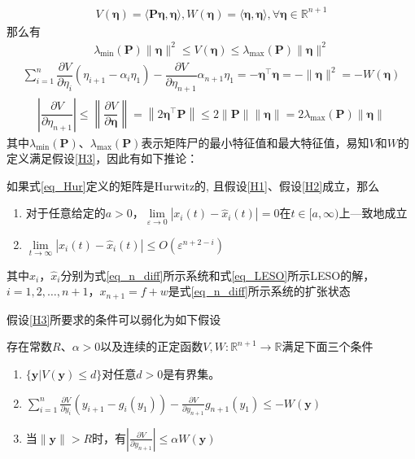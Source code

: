 \begin{align}V(\bm{\eta})=\langle \bm{P} \bm{\eta}, \bm{\eta}\rangle, W(\bm{\eta})=\langle\bm{\eta}, \bm{\eta}\rangle, \forall \bm{\eta} \in \mathbb{R}^{n+1}\end{align}
那么有
\begin{align}\lambda_{\min }(\bm{P})\|\bm{\eta}\|^{2} \leq V(\bm{\eta}) \leq \lambda_{\max }(\bm{P})\|\bm{\eta}\|^{2}\end{align}
\begin{align}\sum_{i=1}^{n} \dfrac{\partial V}{\partial \eta_{i}}\left(\eta_{i+1}-\alpha_{i} \eta_{1}\right)-\dfrac{\partial V}{\partial \eta_{n+1}} \alpha_{n+1} \eta_{1}=-\bm{\eta}^{\top} \bm{\eta}=-\|\bm{\eta}\|^{2}=-W(\bm{\eta})\end{align}
\begin{align}\left|\dfrac{\partial V}{\partial \eta_{n+1}}\right| \leq\left\|\dfrac{\partial V}{\partial \bm{\eta}}\right\|=\left\|2 \bm{\eta}^{\top} \bm{P}\right\| \leq 2\|\bm{P}\|\|\bm{\eta}\|=2 \lambda_{\max }(\bm{P})\|\bm{\eta}\|\end{align}
其中$ \lambda_{\min }(\bm{P}) $、$ \lambda_{\max }(\bm{P}) $表示矩阵尸的最小特征值和最大特征值，易知$ V $和$ W $的定义满足假设\ref{H3}，因此有如下推论：
\begin{corollary}
	如果式\eqref{eq_Hur}定义的矩阵是Hurwitz的, 且假设\ref{H1}、假设\ref{H2}成立，那么
	\begin{enumerate}
		\item 对于任意给定的$ a>0 $，$ \lim\limits_{\varepsilon \rightarrow 0}\left|x_{i}(t)-\hat{x}_{i}(t)\right|=0 $在$t \in [a, \infty)$上—致地成立
		
		\item $ \lim\limits_{t \rightarrow \infty}\left|x_{i}(t)-\hat{x}_{i}(t)\right| \leq O\left(\varepsilon^{n+2-i}\right)  $
	\end{enumerate}
其中$x_{i}$，$ \hat{x}_{i}$分别为式\eqref{eq_n_diff}所示系统和式\eqref{eq_LESO}所示LESO的解，$i=1,2, \ldots, n+1$，$ x_{n+1}=f+w$是式\eqref{eq_n_diff}所示系统的扩张状态	\label{the_LESO}
\end{corollary}
假设\ref{H3}所要求的条件可以弱化为如下假设\cite{Guo_2011}
\begin{assumption}
	存在常数$ R $、$ \alpha>0 $以及连续的正定函数$ V,W:\mathbb{R}^{n+1} \rightarrow \mathbb{R} $满足下面三个条件
	\begin{enumerate}
		\item $\{\bm{y} | V(\bm{y}) \leq d\}$对任意$ d>0 $是有界集。
		\item $\sum_{i=1}^{n} \frac{\partial V}{\partial y_{i}}\left(y_{i+1}-g_{i}\left(y_{1}\right)\right)-\frac{\partial V}{\partial y_{n+1}} g_{n+1}\left(y_{1}\right) \leq-W(\bm{y})$
		\item 当$ \|\bm{y}\|>R $时，有$\left|\frac{\partial V}{\partial y_{n+1}}\right| \leq \alpha W(\bm{y})$		
	\end{enumerate}	\label{H4}
\end{assumption}
